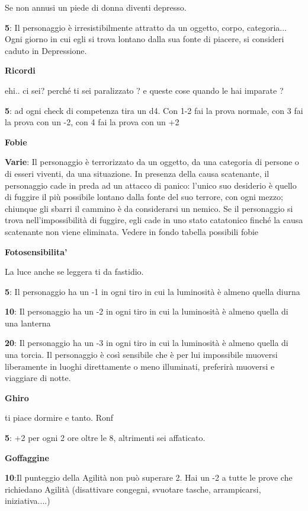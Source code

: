 \documentclass[a4paper,11pt,twoside,openany]{book}
\begin{document}
Se non annusi un piede di donna diventi depresso.

\textbf{5}: Il personaggio è irresistibilmente attratto da un oggetto, corpo, categoria... Ogni giorno in cui egli si trova lontano dalla sua fonte di piacere, si consideri caduto in Depressione.

\textbf{Ricordi}

ehi.. ci sei? perché ti sei paralizzato ? e queste cose quando le hai imparate ?

\textbf{5}: ad ogni check di competenza tira un d4. Con 1-2 fai la prova normale, con 3 fai la prova con un -2, con 4 fai la prova con un +2

\textbf{Fobie}

\textbf{Varie}: Il personaggio è terrorizzato da un oggetto, da una categoria di persone o di esseri viventi, da una situazione. In presenza della causa scatenante, il personaggio cade in preda ad un attacco di panico: l'unico suo desiderio è quello di fuggire il più possibile lontano dalla fonte del suo terrore, con ogni mezzo; chiunque gli sbarri il cammino è da considerarsi un nemico. Se il personaggio si trova nell'impossibilità di fuggire, egli cade in uno stato catatonico finché la causa scatenante non viene eliminata. Vedere in fondo tabella possibili fobie

\textbf{Fotosensibilita'}

La luce anche se leggera ti da fastidio.

\textbf{5}: Il personaggio ha un -1 in ogni tiro in cui la luminosità è almeno quella diurna

\textbf{10}: Il personaggio ha un -2 in ogni tiro in cui la luminosità è almeno quella di una lanterna

\textbf{20}: Il personaggio ha un -3 in ogni tiro in cui la luminosità è almeno quella di una torcia. Il personaggio è così sensibile che è per lui impossibile muoversi liberamente in luoghi direttamente o meno illuminati, preferirà muoversi e viaggiare di notte.

\textbf{Ghiro}

ti piace dormire e tanto. Ronf

\textbf{5}: +2 per ogni 2 ore oltre le 8, altrimenti sei affaticato.

\textbf{Goffaggine}

\textbf{10}:Il punteggio della Agilità non può superare 2. Hai un -2 a tutte le prove che richiedano Agilità (disattivare congegni, svuotare tasche, arrampicarsi, iniziativa....)
\end{document}

